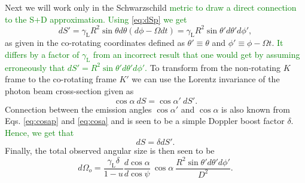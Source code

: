 \documentclass{aa}
\newcommand{\be}{\begin{equation}}
\newcommand{\ee}{\end{equation}}
\newcommand{\refe}[1]{\textcolor{green}{{#1}}}
\newcommand{\refedel}[1]{}
\newcommand{\sch}{Schwarzschild }
\newcommand{\Ob}{\ensuremath{\hat{\Omega}}}
\newcommand{\lgamma}{\gamma_{\text{L}}}
\begin{document}
Next we will work only in the \sch \refe{metric to draw a direct connection to the S+D approximation.}\refedel{and consider only terms up to $\mathcal{O}(\Ob^2)$.}
\refe{Using \eqref{eq:dSp} we get}
\be\label{eq:dS_subs}
dS' = \lgamma R^2 \sin\theta d\theta (d\phi - \Omega dt) = \lgamma R^2 \sin\theta' d\theta' d\phi',
\ee
as given in the co-rotating coordinates defined as $\theta' \equiv \theta$ and $\phi' \equiv \phi - \Omega t$.
\refe{It differs by a factor of $\lgamma$ from an incorrect result that one would get by assuming erroneously that $dS' = R^2 \sin\theta' d\theta' d\phi'$.}
To transform from the non-rotating $K$ frame to the co-rotating frame $K'$ we can use the Lorentz invariance of the photon beam cross-section given as \citep{Terrell60, LB85}
\be
\cos\alpha ~dS = \cos\alpha' ~dS'.
\ee
Connection between the emission angles $\cos\alpha'$ and $\cos\alpha$ is also known from Eqs. \eqref{eq:cosap} and \eqref{eq:cosa} and is seen to be a simple Doppler boost factor $\delta$.
\refe{Hence, we get that}
\be\label{eq:dSisdSp}
dS = \delta dS'.
\ee
Finally, the total observed angular size is then seen to be 
\be
d\Omega_o = \frac{\lgamma \delta}{1-u} \frac{d \cos\alpha}{d \cos\psi} ~\cos\alpha ~ \frac{R^2 \sin\theta' d\theta' d\phi'}{D^2}.
\ee
\end{document}
